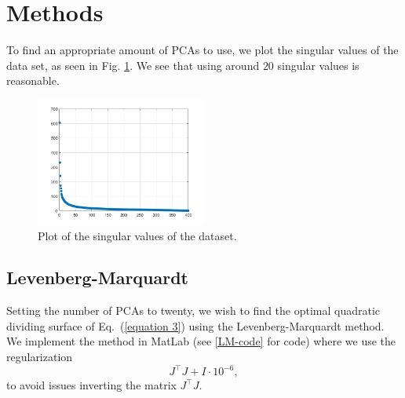 \documentclass[12pt]{article}%
\newcommand\fullref[1]{Eq.~(\ref*{#1})} %
\begin{document}
\section{Methods}
To find an appropriate amount of PCAs to use, we plot the singular values of the data set, as seen in Fig. \ref{figpca}. We see that using around $20$ singular values is reasonable.

\begin{figure}[H]
    \centering
    \includegraphics[width=0.5\textwidth,height=\textwidth,keepaspectratio]{images/PCA.png}
    \caption{Plot of the singular values of the dataset.}
    \label{figpca}
\end{figure}

\subsection{Levenberg-Marquardt}
Setting the number of PCAs to twenty, we wish to find the optimal quadratic dividing surface of \fullref{equation 3} using the Levenberg-Marquardt method. We implement the method in MatLab (see \ref{LM-code} for code) where we use the regularization 
\begin{equation*}
    J^\top J + I \cdot 10^{-6},
\end{equation*}
to avoid issues inverting the matrix $J^\top J$.  
\end{document}
